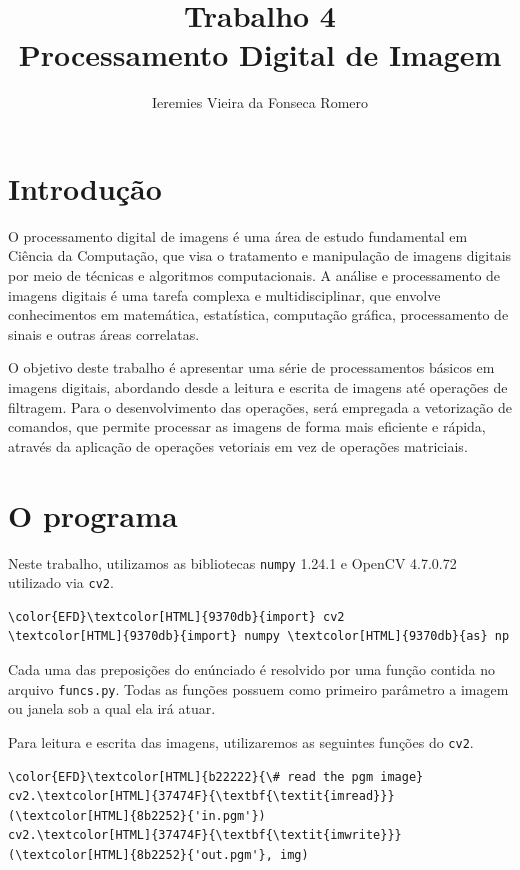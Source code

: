 \documentclass[11pt]{article}
\author{Ieremies Vieira da Fonseca Romero}
\date{}
\title{Trabalho 4\\\medskip
\large Processamento Digital de Imagem}
\begin{document}
\maketitle


\section*{Introdução}
\label{sec:org52659e6}
O processamento digital de imagens é uma área de estudo fundamental em Ciência da Computação, que visa o tratamento e manipulação de imagens digitais por meio de técnicas e algoritmos computacionais.
A análise e processamento de imagens digitais é uma tarefa complexa e multidisciplinar, que envolve conhecimentos em matemática, estatística, computação gráfica, processamento de sinais e outras áreas correlatas.

O objetivo deste trabalho é apresentar uma série de processamentos básicos em imagens digitais, abordando desde a leitura e escrita de imagens até operações de filtragem.
Para o desenvolvimento das operações, será empregada a vetorização de comandos, que permite processar as imagens de forma mais eficiente e rápida, através da aplicação de operações vetoriais em vez de operações matriciais.

\section*{O programa}
\label{sec:org5f94a0c}
Neste trabalho, utilizamos as bibliotecas \texttt{numpy} 1.24.1 e OpenCV 4.7.0.72 utilizado via \texttt{cv2}.
\begin{Code}
\begin{Verbatim}
\color{EFD}\textcolor[HTML]{9370db}{import} cv2
\textcolor[HTML]{9370db}{import} numpy \textcolor[HTML]{9370db}{as} np
\end{Verbatim}
\end{Code}

Cada uma das preposições do enúnciado é resolvido por uma função contida no arquivo \texttt{funcs.py}.
Todas as funções possuem como primeiro parâmetro a imagem ou janela sob a qual ela irá atuar.

Para leitura e escrita das imagens, utilizaremos as seguintes funções do \texttt{cv2}.
\begin{Code}
\begin{Verbatim}
\color{EFD}\textcolor[HTML]{b22222}{\# read the pgm image}
cv2.\textcolor[HTML]{37474F}{\textbf{\textit{imread}}}(\textcolor[HTML]{8b2252}{'in.pgm'})
cv2.\textcolor[HTML]{37474F}{\textbf{\textit{imwrite}}}(\textcolor[HTML]{8b2252}{'out.pgm'}, img)
\end{Verbatim}
\end{Code}
\end{document}
